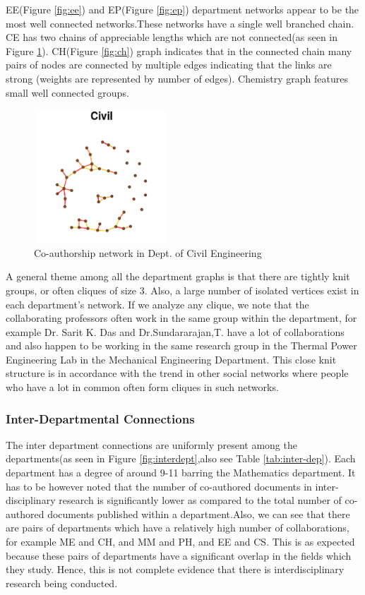 \documentclass[conference,compsoc]{IEEEtran}
\begin{document}
EE(Figure \ref{fig:ee}) and EP(Figure \ref{fig:ep}) department networks appear to be the most well connected networks.These networks have a single well branched chain. CE has two chains of appreciable lengths which are not connected(as seen in Figure \ref{fig:civil}). CH(Figure \ref{fig:ch}) graph indicates that in the connected chain many pairs of nodes are connected by multiple edges indicating that the links are strong (weights are represented by number of edges). Chemistry graph features small well connected groups.

\begin{figure}[t]
    \centering
    \includegraphics[width=5cm,height=5cm]{civil}
    \caption{Co-authorship network in Dept. of Civil Engineering}
    \label{fig:civil}
\end{figure}

A general theme among all the department graphs is that there are tightly knit groups, or often cliques of size 3. Also, a large number of isolated vertices exist in each department’s network. If we analyze any clique, we note that the collaborating professors often work in the same group within the department, for example Dr. Sarit K. Das and Dr.Sundararajan,T. have a lot of collaborations and also happen to be working in the same research group in the Thermal Power Engineering Lab in the Mechanical Engineering Department. This close knit structure is in accordance with the trend in other social networks where people who have a lot in common often form cliques in such networks.

\subsubsection*{Inter-Departmental Connections}

The inter department connections are uniformly present among the departments(as seen in Figure \ref{fig:interdept},also see Table \ref{tab:inter-dep}). Each department has a degree of around 9-11 barring the Mathematics department. It has to be however noted that the number of co-authored documents in inter-disciplinary research is significantly lower as compared to the total number of co-authored documents published within a department.Also, we can see that there are pairs of departments which have a relatively high number of collaborations, for example ME and CH, and MM and PH, and EE and CS. This is as expected because these pairs of departments have a significant overlap in the fields which they study. Hence, this is not complete evidence that there is interdisciplinary research being conducted. 
\end{document}
